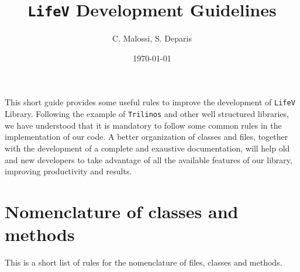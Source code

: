 \documentclass[a4paper]{article}
\title{\texttt{LifeV} Development Guidelines}
\author{C. Malossi, S. Deparis}
\date{\today}
\begin{document}
\maketitle

This short guide provides some useful rules to improve the
development of \texttt{LifeV} Library. Following the example of
\texttt{Trilinos} and other well structured libraries, we have understood that
it is mandatory to follow some common rules in the implementation of our code.
A better organization of classes and files, together with the development of a
complete and exaustive documentation, will help old and new developers to
take advantage of all the available features of our library, improving
productivity and results.

\section{Nomenclature of classes and methods}
This is a short list of rules for the nomenclature of files, classes and
methods.
\end{document}
